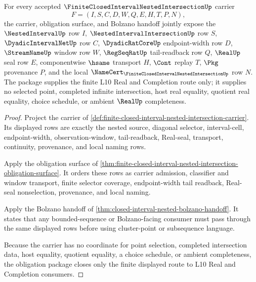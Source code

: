 \begin{theorem}
\label{thm:finite-closed-interval-nested-intersection-obligation-closure-package}
For every accepted $\FiniteClosedIntervalNestedIntersectionUp$ carrier
$$
F=(I,S,C,D,W,Q,E,H,T,P,N),
$$
the carrier, obligation surface, and Bolzano handoff jointly expose the $\NestedIntervalUp$ row $I$, $\NestedIntervalIntersectionUp$ row $S$, $\DyadicIntervalNetUp$ row $C$, $\DyadicRatCoreUp$ endpoint-width row $D$, $\StreamNameUp$ window row $W$, $\RegSeqRatUp$ tail-readback row $Q$, $\RealUp$ seal row $E$, componentwise $\hsame$ transport $H$, $\Cont$ replay $T$, $\Pkg$ provenance $P$, and the local $\NameCert_{\FiniteClosedIntervalNestedIntersectionUp}$ row $N$. The package supplies the finite L10 Real and Completion route only; it supplies no selected point, completed infinite intersection, host real equality, quotient real equality, choice schedule, or ambient $\RealUp$ completeness.
\end{theorem}
\begin{proof}
Project the carrier of \autoref{def:finite-closed-interval-nested-intersection-carrier}. Its displayed rows are exactly the nested source, diagonal selector, interval-cell, endpoint-width, observation-window, tail-readback, Real-seal, transport, continuity, provenance, and local naming rows.

Apply the obligation surface of \autoref{thm:finite-closed-interval-nested-intersection-obligation-surface}. It orders these rows as carrier admission, classifier and window transport, finite selector coverage, endpoint-width tail readback, Real-seal nonselection, provenance, and local naming.

Apply the Bolzano handoff of \autoref{thm:closed-interval-nested-bolzano-handoff}. It states that any bounded-sequence or Bolzano-facing consumer must pass through the same displayed rows before using cluster-point or subsequence language.

Because the carrier has no coordinate for point selection, completed intersection data, host equality, quotient equality, a choice schedule, or ambient completeness, the obligation package closes only the finite displayed route to L10 Real and Completion consumers.
\end{proof}

